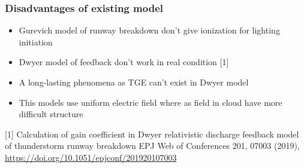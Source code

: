 \documentclass[8pt,pdf,hyperref={unicode}]{beamer}
\begin{document}
\begin{frame}
\frametitle{Disadvantages of existing model}
\begin{itemize}
    \item Gurevich model of runway breakdown don't give ionization for lighting initiation
    \item Dwyer model of feedback don't work in real condition [1]
    \item A long-lasting phenomena as TGE  can't exist in Dwyer model
    \item This models use uniform electric field where as field in cloud have more difficult structure 
\end{itemize}
\small{[1] Calculation of gain coefficient in Dwyer relativistic discharge feedback model of thunderstorm runway breakdown
    EPJ Web of Conferences 201, 07003 (2019), \url{https://doi.org/10.1051/epjconf/201920107003}}
\end{frame}
\end{document}
